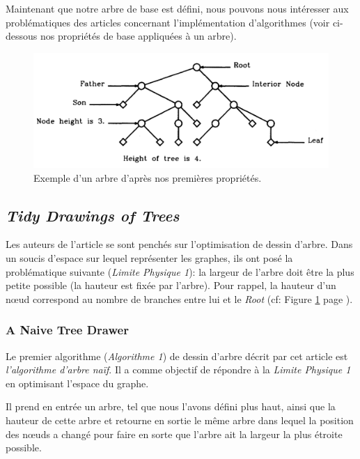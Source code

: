 \documentclass{article}
\begin{document}
Maintenant que notre arbre de base est défini, nous pouvons nous intéresser aux problématiques des articles concernant l'implémentation d'algorithmes (voir ci-dessous nos propriétés de base appliquées à un arbre).

\vfill
\begin{figure}[h]
		\begin{center}
			\includegraphics[scale=0.4]{arbre.png}
		\end{center}
	\caption{Exemple d'un arbre d'après nos premières propriétés. \cite{article79}}
  \label{fig:arbre}
\end{figure}
\vfill

\newpage
  \subsection{\emph{Tidy Drawings of Trees}}

  Les auteurs de l'article se sont penchés sur l'optimisation de dessin d'arbre. Dans un soucis d'espace sur lequel représenter les graphes, ils ont posé la problématique suivante (\emph{Limite Physique 1}):  la largeur de l’arbre doit être la plus petite possible (la hauteur est fixée par l’arbre). Pour rappel, la hauteur d'un n\oe{}ud correspond au nombre de branches entre lui et le \emph{Root} (cf: Figure \ref{fig:arbre} page \pageref{fig:arbre}).
    \subsubsection{A Naive Tree Drawer}

    Le premier algorithme (\emph{Algorithme 1}) de dessin d'arbre décrit par cet article est \emph{l'algorithme d'arbre naïf}. Il a comme objectif de répondre à la \emph{Limite Physique 1} en optimisant l'espace du graphe.

    Il prend en entrée un arbre, tel que nous l'avons défini plus haut, ainsi que la hauteur de cette arbre et retourne en sortie le même arbre dans lequel la position des n\oe{}uds a changé pour faire en sorte que l'arbre ait la largeur la plus étroite possible.
\end{document}
